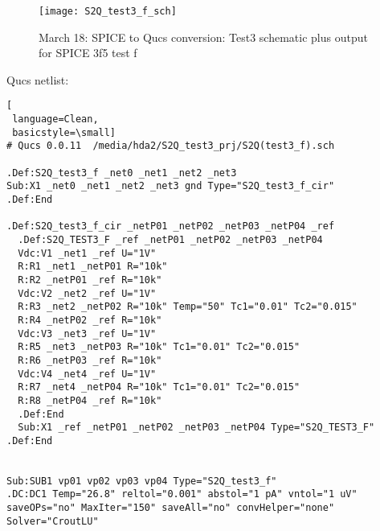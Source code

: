 \newpage 
\begin{figure}
  \centering
  \texttt{[image: S2Q\_test3\_f\_sch]}
  \caption{March 18: SPICE to Qucs conversion: Test3 schematic plus output for SPICE 3f5 test f} 
  \label{fig:S2Qtest3_3}
\end{figure} 


Qucs netlist:
\begin{lstlisting}[
 language=Clean, 
 basicstyle=\small]
# Qucs 0.0.11  /media/hda2/S2Q_test3_prj/S2Q(test3_f).sch

.Def:S2Q_test3_f _net0 _net1 _net2 _net3
Sub:X1 _net0 _net1 _net2 _net3 gnd Type="S2Q_test3_f_cir"
.Def:End

.Def:S2Q_test3_f_cir _netP01 _netP02 _netP03 _netP04 _ref
  .Def:S2Q_TEST3_F _ref _netP01 _netP02 _netP03 _netP04
  Vdc:V1 _net1 _ref U="1V"
  R:R1 _net1 _netP01 R="10k"
  R:R2 _netP01 _ref R="10k"
  Vdc:V2 _net2 _ref U="1V"
  R:R3 _net2 _netP02 R="10k" Temp="50" Tc1="0.01" Tc2="0.015"
  R:R4 _netP02 _ref R="10k"
  Vdc:V3 _net3 _ref U="1V"
  R:R5 _net3 _netP03 R="10k" Tc1="0.01" Tc2="0.015"
  R:R6 _netP03 _ref R="10k"
  Vdc:V4 _net4 _ref U="1V"
  R:R7 _net4 _netP04 R="10k" Tc1="0.01" Tc2="0.015"
  R:R8 _netP04 _ref R="10k"
  .Def:End
  Sub:X1 _ref _netP01 _netP02 _netP03 _netP04 Type="S2Q_TEST3_F"
.Def:End


Sub:SUB1 vp01 vp02 vp03 vp04 Type="S2Q_test3_f"
.DC:DC1 Temp="26.8" reltol="0.001" abstol="1 pA" vntol="1 uV" 
saveOPs="no" MaxIter="150" saveAll="no" convHelper="none" Solver="CroutLU"

\end{lstlisting}

